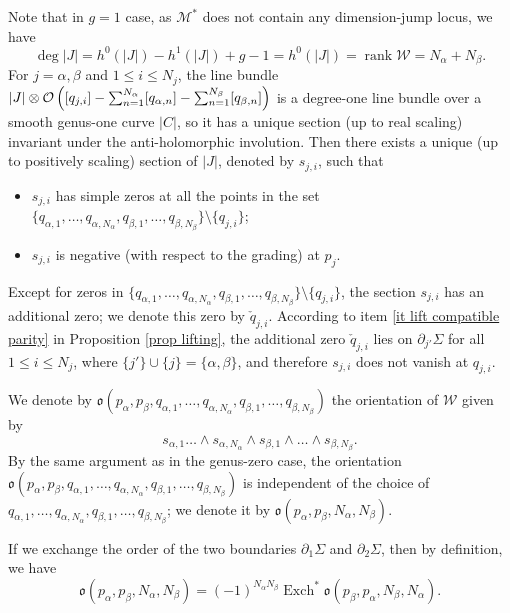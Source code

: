 \documentclass[11pt,a4paper]{article}
\theoremstyle{definition}
\theoremstyle{remark}
\numberwithin{equation}{section}
\def\Mstar{{{\mathcal M^*}}}
\begin{document}
Note that in $g=1$ case, as $\Mstar$ does not contain any dimension-jump locus, we have 
$$\deg \lvert J\rvert=h^0(\lvert J\rvert)-h^1(\lvert J\rvert)+g-1=  h^0(\lvert J\rvert)=\operatorname{rank} \mathcal W =N_\alpha+N_\beta.$$ 
 For $j=\alpha,\beta$ and $1\le i \le N_j$, 
 the line bundle $\mathcal \lvert J\rvert\otimes \mathcal O\left([q_{j,i}]-\sum_{n=1}^{N_\alpha} [q_{\alpha,n}]-\sum_{n=1}^{N_\beta} [q_{\beta,n}]\right)$ is a degree-one line bundle over a smooth genus-one curve $\lvert C \rvert$, so it has a unique section (up to real scaling) invariant under the anti-holomorphic involution.
 Then there exists a unique (up to positively scaling) section of $\lvert J\rvert$, denoted by $s_{j,i}$, such that 
\begin{itemize}
    \item $s_{j,i}$ has simple zeros at all the points in the set $\{q_{\alpha,1},\dots,q_{\alpha,N_\alpha},q_{\beta,1},\dots,q_{\beta,N_\beta}\}\setminus\{q_{j,i}\}$;
    \item $s_{j,i}$ is negative (with respect to the grading) at $p_j$.
\end{itemize}


Except for zeros in $\{q_{\alpha,1},\dots,q_{\alpha,N_\alpha},q_{\beta,1},\dots,q_{\beta,N_\beta}\}\setminus\{q_{j,i}\}$, the section $s_{j,i}$ has an additional zero; we denote this zero by $\check{q}_{j,i}$. According to item \ref{it lift compatible parity} in Proposition \ref{prop lifting}, the additional zero $\check{q}_{j,i}$ lies on $\partial_{j'}\Sigma$ for all $1\le i \le N_j$, where $\{j'\}\cup\{j\}=\{\alpha,\beta\}$, and therefore $s_{j,i}$ does not vanish at $q_{j,i}$. 

We denote by $\mathfrak o(p_\alpha,p_\beta,q_{\alpha,1},\dots,q_{\alpha,N_\alpha},q_{\beta,1},\dots,q_{\beta,N_\beta})$   the orientation of $\mathcal W$ given by
$$
s_{\alpha,1}\dots \wedge s_{\alpha,N_\alpha}\wedge s_{\beta,1}\wedge \dots \wedge s_{\beta,N_\beta}.
$$
By the same argument as in the genus-zero case, the orientation $\mathfrak o(p_\alpha,p_\beta,q_{\alpha,1},\dots,q_{\alpha,N_\alpha},q_{\beta,1},\dots,q_{\beta,N_\beta})$ is independent of the choice of $q_{\alpha,1},\dots,q_{\alpha,N_\alpha},q_{\beta,1},\dots,q_{\beta,N_\beta}$; we denote it by $\mathfrak o(p_\alpha,p_\beta,N_\alpha,N_\beta)$.

If we exchange the order of the two boundaries $\partial_1\Sigma$ and $\partial_2\Sigma$, then by definition, we have 
\begin{equation}\label{eq change of orientation of witten when exchange two bdries}
\mathfrak o(p_\alpha,p_\beta,N_\alpha,N_\beta)=(-1)^{N_\alpha N_\beta}\operatorname{Exch}^*\mathfrak o(p_\beta,p_\alpha,N_\beta,N_\alpha).
\end{equation}
\end{document}
